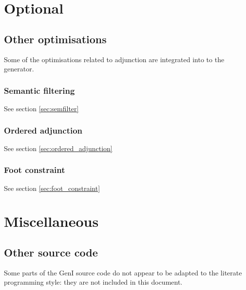 \documentclass[a4paper,11pt]{report}
\begin{document}




\part{Optional}




\chapter{Other optimisations}
\label{chp:other_optimisations}

Some of the optimisations related to adjunction are integrated into
to the generator.

\section{Semantic filtering}

See section \ref{sec:semfilter}

\section{Ordered adjunction}

See section \ref{sec:ordered_adjunction}

\section{Foot constraint}

See section \ref{sec:foot_constraint}

\part{Miscellaneous}


%
%

\chapter{Other source code}
\label{cha:other}

Some parts of the GenI source code do not appear to be adapted to the
literate programming style: they are not included in this document.
\end{document}
